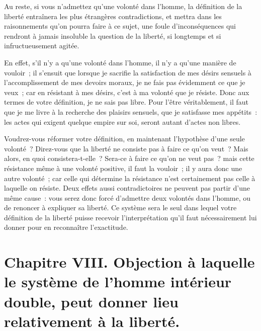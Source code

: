 \documentclass[french,twoside]{book} %
\newcommand\chapteropen{} %
\newcommand\chapterclose{} %
\begin{document}
Au reste, si vous n’admettez qu’une volonté dans l’homme, la définition de la liberté entraînera les plus étrangères contradictions, et mettra dans les raisonnements qu’on pourra faire à ce sujet, une foule d’inconséquences qui rendront à jamais insoluble la question de la liberté, si longtemps et si infructueusement agitée.\par
En effet, s’il n’y a qu’une volonté dans l’homme, il n’y a qu’une manière de vouloir ; il s’ensuit que lorsque je sacrifie la satisfaction de mes désirs sensuels à l’accomplissement de mes devoirs moraux, je ne fais pas évidemment ce que je veux ; car en résistant à mes désirs, c’est à ma volonté que je résiste. Donc aux termes de votre définition, je ne sais pas libre. Pour l’être véritablement, il faut que je me livre à la recherche des plaisirs sensuels, que je satisfasse mes appétits : les actes qui exigent quelque empire sur soi, seront autant d’actes non libres.\par
Voudrez-vous réformer votre définition, en maintenant l’hypothèse d’une seule volonté ? Direz-vous que la liberté ne consiste pas à faire ce qu’on veut ? Mais alors, en quoi consistera-t-elle ? Sera-ce à faire ce qu’on ne veut pas ? mais cette résistance même à une volonté positive, il faut la vouloir ; il y aura donc une autre volonté ; car celle qui détermine la résistance n’est certainement pas celle à laquelle on résiste. Deux effets aussi contradictoires ne peuvent pas partir d’une même cause : vous serez donc forcé d’admettre deux volontés dans l’homme, ou de renoncer à expliquer sa liberté. Ce système sera le seul dans lequel votre définition de la liberté puisse recevoir l’interprétation qu’il faut nécessairement lui donner pour en reconnaître l’exactitude.
\chapterclose


\chapteropen
\chapter[{Chapitre VIII. Objection à laquelle le système de l’homme intérieur double, peut donner lieu relativement à la liberté.}]{Chapitre VIII. Objection à laquelle le système de l’homme intérieur double, peut donner lieu relativement à la liberté.}\renewcommand{\leftmark}{Chapitre VIII. Objection à laquelle le système de l’homme intérieur double, peut donner lieu relativement à la liberté.}
\end{document}
